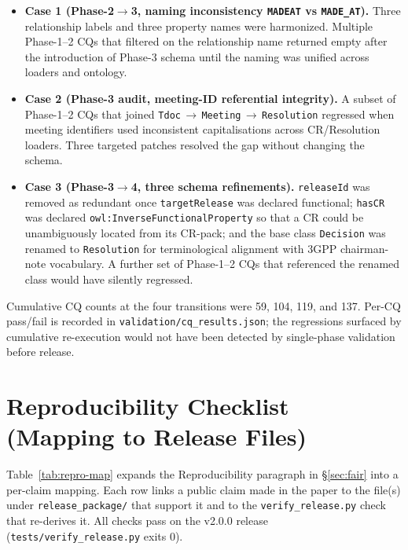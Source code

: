 \begin{itemize}
\item \textbf{Case 1 (Phase-2$\to$3, naming inconsistency \texttt{MADEAT} vs \texttt{MADE\_AT}).} Three relationship labels and three property names were harmonized. Multiple Phase-1--2 CQs that filtered on the relationship name returned empty after the introduction of Phase-3 schema until the naming was unified across loaders and ontology.
\item \textbf{Case 2 (Phase-3 audit, meeting-ID referential integrity).} A subset of Phase-1--2 CQs that joined \texttt{Tdoc}\,$\to$\,\texttt{Meeting}\,$\to$\,\texttt{Resolution} regressed when meeting identifiers used inconsistent capitalisations across CR/Resolution loaders. Three targeted patches resolved the gap without changing the schema.
\item \textbf{Case 3 (Phase-3$\to$4, three schema refinements).} \texttt{releaseId} was removed as redundant once \texttt{targetRelease} was declared functional; \texttt{hasCR} was declared \texttt{owl:InverseFunctionalProperty} so that a CR could be unambiguously located from its CR-pack; and the base class \texttt{Decision} was renamed to \texttt{Resolution} for terminological alignment with 3GPP chairman-note vocabulary. A further set of Phase-1--2 CQs that referenced the renamed class would have silently regressed.
\end{itemize}

Cumulative CQ counts at the four transitions were 59, 104, 119, and 137. Per-CQ pass/fail is recorded in \texttt{validation/cq\_results.json}; the regressions surfaced by cumulative re-execution would not have been detected by single-phase validation before release.

\section{Reproducibility Checklist (Mapping to Release Files)}\label{app:repro}

Table~\ref{tab:repro-map} expands the Reproducibility paragraph in §\ref{sec:fair} into a per-claim mapping. Each row links a public claim made in the paper to the file(s) under \texttt{release\_package/} that support it and to the \texttt{verify\_release.py} check that re-derives it. All checks pass on the v2.0.0 release (\texttt{tests/verify\_release.py} exits 0).

